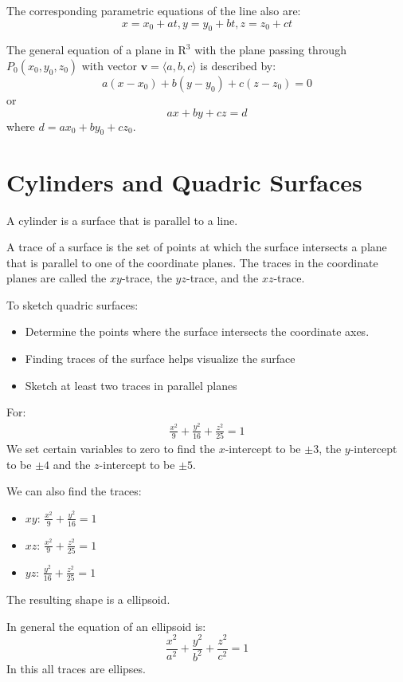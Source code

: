 \documentclass[../calc3.tex]{subfiles}
\begin{document}
The corresponding parametric equations of the line also are:
\[x=x_0+at, y=y_0+bt, z=z_0+ct\]

The general equation of a plane in $\mathrm{R}^3$ with the plane passing through 
$P_0(x_0,y_0,z_0)$ with vector $\textbf{v}=\langle a,b,c\rangle$ is described by:
\[a(x-x_0)+b(y-y_0)+c(z-z_0)=0\]
or 
\[ax+by+cz=d\] where $d=ax_0+by_0+cz_0$.

\section{Cylinders and Quadric Surfaces}
A cylinder is a surface that is parallel to a line.

A trace of a surface is the set of points at which the surface intersects a plane that is 
parallel to one of the coordinate planes. The traces in the coordinate planes are called the 
$xy$-trace, the $yz$-trace, and the $xz$-trace.

To sketch quadric surfaces:
\begin{itemize}
    \item Determine the points where the surface intersects the coordinate axes. 
    \item Finding traces of the surface helps visualize the surface
    \item Sketch at least two traces in parallel planes
\end{itemize}

\begin{example}
    For:
    \begin{align*}
        \frac{x^2}{9}+\frac{y^2}{16}+\frac{z^2}{25}=1
    \end{align*}
    We set certain variables to zero to find the $x$-intercept to be $\pm 3$, the $y$-intercept 
    to be $\pm 4$ and the $z$-intercept to be $\pm 5$.

    We can also find the traces:
    \begin{itemize}
        \item $xy$: $\frac{x^2}{9}+\frac{y^2}{16}=1$
        \item $xz$: $\frac{x^2}{9}+\frac{z^2}{25}=1$
        \item $yz$: $\frac{y^2}{16}+\frac{z^2}{25}=1$
    \end{itemize}

    The resulting shape is a ellipsoid.
\end{example}

In general the equation of an ellipsoid is:
\[\frac{x^2}{a^2}+\frac{y^2}{b^2}+\frac{z^2}{c^2}=1\]
In this all traces are ellipses.
\end{document}
